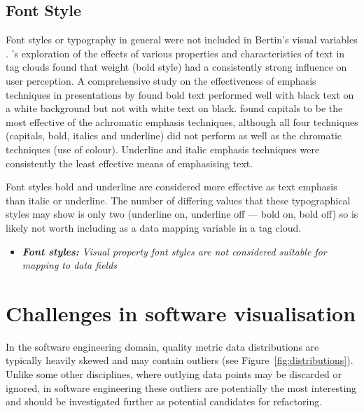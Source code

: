 \subsection{Font Style}   

Font styles or typography in general were not included in Bertin's visual variables \citet{bertin83}. \citet{bateman08}'s exploration of the effects of various properties and characteristics of text in tag clouds found that weight (bold style) had a consistently strong influence on user perception. A comprehensive study on the effectiveness of emphasis techniques in presentations by \citet{preston10} found bold text performed well with black text on a white background but not with white text on black.  \citet{preston10} found capitals to be the most effective of the achromatic emphasis techniques, although all four techniques (capitals, bold, italics and underline) did not perform as well as the chromatic techniques (use of colour).  Underline and italic emphasis techniques were consistently the least effective means of emphasising text. 

Font styles bold and underline are considered more effective as text emphasis than italic or underline. The number of differing values that these typographical styles may show is only two (underline on, underline off --- bold on, bold off) so is likely not worth including as a data mapping variable in a tag cloud. 

\begin{itemize}
	\item \emph{\textbf{Font styles:} Visual property font styles are not considered suitable for mapping to data fields}	
\end{itemize}

\section{Challenges in software visualisation}\label{sect:challenges}

In the software engineering domain, quality metric data distributions are typically heavily skewed and may contain outliers (see Figure~\vref{fig:distributions}). Unlike some other disciplines, where outlying data points may be discarded or ignored, in software engineering these outliers are potentially the most interesting and should be investigated further as potential candidates for refactoring. 

